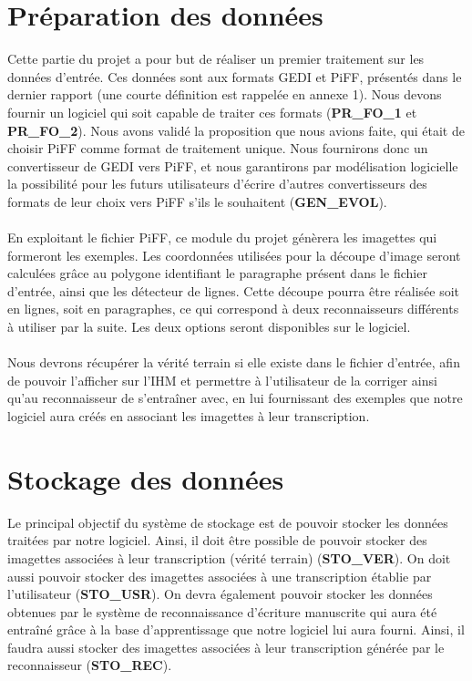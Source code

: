 \section{Préparation des données}

Cette partie du projet a pour but de réaliser un premier traitement sur les
données d’entrée. Ces données sont aux formats GEDI et PiFF, présentés dans
le dernier rapport (une courte définition est rappelée en annexe 1). 
Nous devons fournir un logiciel qui soit capable de
traiter ces formats (\textbf{PR\_FO\_1} et \textbf{PR\_FO\_2}). Nous avons validé
la proposition que nous avions faite, qui était de choisir PiFF comme format
de traitement unique. Nous fournirons donc un convertisseur de GEDI vers PiFF,
et nous garantirons par modélisation logicielle la possibilité pour les futurs
utilisateurs d’écrire d’autres convertisseurs des formats de leur choix vers
PiFF s’ils le souhaitent (\textbf{GEN\_EVOL}).

\paragraph{}
En exploitant le fichier PiFF, ce module du projet génèrera les imagettes qui
formeront les exemples. Les coordonnées utilisées pour la découpe d’image seront
calculées grâce au polygone identifiant le paragraphe présent dans le fichier
d’entrée, ainsi que les détecteur de lignes. Cette découpe pourra être réalisée
soit en lignes, soit en paragraphes, ce qui correspond à deux reconnaisseurs
différents à utiliser par la suite. Les deux options seront
disponibles sur le logiciel.

\paragraph{}
Nous devrons récupérer la vérité terrain si elle existe dans le fichier d’entrée,
afin de pouvoir l’afficher sur l’IHM et permettre à l’utilisateur de la corriger
ainsi qu’au reconnaisseur de s’entraîner avec, en lui fournissant des exemples
que notre logiciel aura créés en associant les imagettes à leur transcription.

\section{Stockage des données}

Le principal objectif du système de stockage est de pouvoir stocker les données
traitées par notre logiciel. Ainsi, il doit être possible de pouvoir stocker
des imagettes associées à leur transcription (vérité terrain) (\textbf{STO\_VER}).
On doit aussi pouvoir stocker des imagettes associées à une transcription établie
par l’utilisateur (\textbf{STO\_USR}). On devra également pouvoir stocker les
données obtenues par le système de reconnaissance d’écriture manuscrite qui aura
été entraîné grâce à la base d’apprentissage que notre logiciel lui aura fourni.
Ainsi, il faudra aussi stocker des imagettes associées à leur transcription
générée par le reconnaisseur (\textbf{STO\_REC}).

